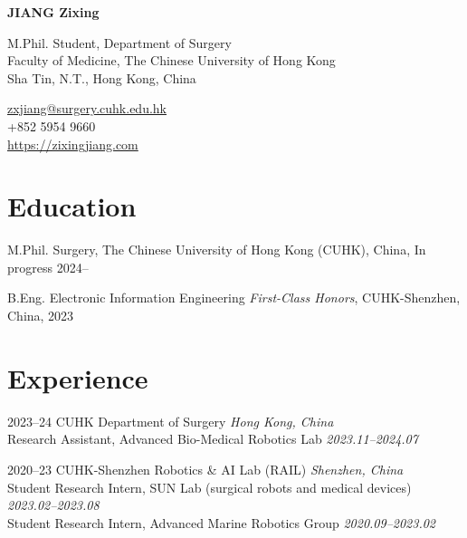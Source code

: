 \documentclass[11pt,letterpaper]{report}
\newcommand{\myname}{JIANG Zixing}
\newcommand{\namefont}[1]{{\normalfont\bfseries\Huge{#1}}}
\begin{document}
\raggedright{}
	
\namefont{\myname}
	
\vspace{1em}
\begin{minipage}[t]{0.700\textwidth}
	M.Phil. Student, Department of Surgery\\
	Faculty of Medicine, The Chinese University of Hong Kong\\
	Sha Tin, N.T., Hong Kong, China
\end{minipage}
\begin{minipage}[t]{0.295\textwidth}
	\flushright{}
	\href{mailto:zxjiang@surgery.cuhk.edu.hk}{zxjiang@surgery.cuhk.edu.hk} \\
	+852 5954 9660 \\
	\href{https://zixingjiang.com}{https://zixingjiang.com}
\end{minipage}
	
\section*{Education}
\begin{tablist}
	\item[M.Phil.]  \tab{}Surgery, The Chinese University of Hong Kong (CUHK), China, In progress 2024--\\
	\item[B.Eng.]  \tab{}Electronic Information Engineering \textit{First-Class Honors}, CUHK-Shenzhen, China, 2023\\
\end{tablist}
	

\section*{Experience}
	
\begin{tablist}
	\item[2023--24]   \tab{}CUHK Department of Surgery \hfill \textit{Hong Kong, China}\\
	Research Assistant, Advanced Bio-Medical Robotics Lab \hfill \textit{2023.11--2024.07}
		
	\item[2020--23]   \tab{}CUHK-Shenzhen Robotics \& AI Lab (RAIL) \hfill \textit{Shenzhen, China}\\
	Student Research Intern, SUN Lab (surgical robots and medical devices) \hfill \textit{2023.02--2023.08}\\
	Student Research Intern, Advanced Marine Robotics Group \hfill \textit{2020.09--2023.02}
\end{tablist}
	
\end{document}

